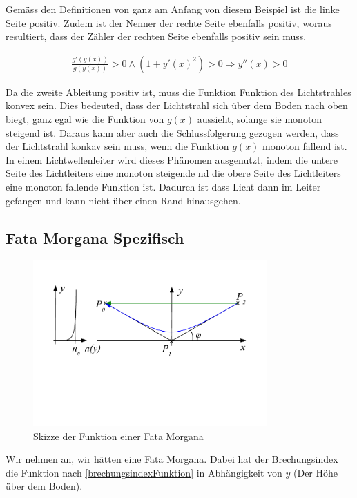 Gemäss den Definitionen von ganz am Anfang von diesem Beispiel ist die linke Seite positiv. 
Zudem ist der Nenner der rechte Seite ebenfalls positiv, woraus resultiert, dass der Zähler 
der rechten Seite ebenfalls positiv sein muss.

\begin{align}
\frac{g'(y(x))}{g(y(x))} > 0 \wedge (1 + y'(x)^2) > 0 \Rightarrow y''(x) > 0
\end{align}

Da die zweite Ableitung positiv ist, muss die Funktion Funktion des Lichtstrahles konvex sein.
Dies bedeuted, dass der Lichtstrahl sich über dem Boden nach oben biegt, 
ganz egal wie die Funktion von $g(x)$ aussieht, solange sie monoton steigend ist.
Daraus kann aber auch die Schlussfolgerung gezogen werden, dass der Lichtstrahl konkav sein muss, 
wenn die Funktion $g(x)$ monoton fallend ist. 
In einem Lichtwellenleiter wird dieses Phänomen ausgenutzt, indem die untere Seite des Lichtleiters eine monoton steigende
nd die obere Seite des Lichtleiters eine monoton fallende Funktion ist. 
Dadurch ist dass Licht dann im Leiter gefangen und kann nicht über einen Rand hinausgehen.

\subsection{Fata Morgana Spezifisch}

\begin{figure}[H]
	\includegraphics[width=0.8\textwidth]{./picture/FataMorgana.pdf}
	\caption{Skizze der Funktion einer Fata Morgana}
	\label{Ab:fata}
\end{figure}


Wir nehmen an, wir hätten eine Fata Morgana. 
Dabei hat der Brechungsindex die Funktion nach \eqref{brechungsindexFunktion} in Abhängigkeit von $y$ 
(Der Höhe über dem Boden).


